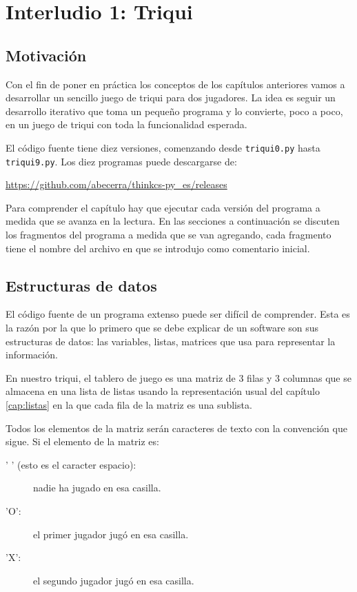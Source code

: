 
\chapter{Interludio 1: Triqui }

\label{cap:inter1:triqui} 

\section{Motivación}

Con el fin de poner en práctica los conceptos de los capítulos anteriores
vamos a desarrollar un sencillo juego de triqui para dos jugadores.
La idea es seguir un desarrollo iterativo que toma un pequeño programa
y lo convierte, poco a poco, en un juego de triqui con toda la funcionalidad
esperada.

El código fuente tiene diez versiones, comenzando desde \texttt{triqui0.py}
hasta \texttt{triqui9.py}. Los diez programas puede descargarse de:

\url{https://github.com/abecerra/thinkcs-py_es/releases}

Para comprender el capítulo hay que ejecutar cada versión del programa
a medida que se avanza en la lectura. En las secciones a continuación
se discuten los fragmentos del programa a medida que se van agregando,
cada fragmento tiene el nombre del archivo en que se introdujo como
comentario inicial.

\section{Estructuras de datos}

El código fuente de un programa extenso puede ser difícil de comprender.
Esta es la razón por la que lo primero que se debe explicar de un
software son sus estructuras de datos: las variables, listas, matrices
que usa para representar la información.

En nuestro triqui, el tablero de juego es una matriz de 3 filas y
3 columnas que se almacena en una lista de listas usando la representación
usual del capítulo \ref{cap:listas} en la que cada fila de la matriz
es una sublista.

Todos los elementos de la matriz serán caracteres de texto con la
convención que sigue. Si el elemento de la matriz es:
\begin{description}
\item [{' ' (esto es el caracter espacio):}] nadie ha jugado en esa casilla. 
\item [{'O': }] el primer jugador jugó en esa casilla. 
\item [{'X':}] el segundo jugador jugó en esa casilla. 
\end{description}

